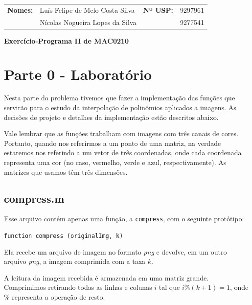 \documentclass[12pt,letterpaper]{article}
\begin{document}
	
	\begin{table}[]
		\centering
		\label{my-label}
		\begin{tabular}{llll}
			\textbf{Nomes:}&Luís Felipe de Melo Costa Silva &   \textbf{Nº USP:} & 9297961 \\
			& Nícolas Nogueira Lopes da Silva &         & 9277541 \\
		\end{tabular}
	\end{table}
	
	\begin{center}
		\huge \bf
		Exercício-Programa II de MAC0210 \\
	\end{center}
	
	\section{Parte 0 - Laboratório}
	
	Nesta parte do problema tivemos que fazer a implementação das funções que servirão para o estudo da interpolação de polinômios aplicados a imagens. As decisões de projeto e detalhes da implementação estão descritos abaixo. 
	
	Vale lembrar que as funções trabalham com imagens com três canais de cores. Portanto, quando nos referirmos a um ponto de uma matriz, na verdade estaremos nos referindo a um vetor de três coordenadas, onde cada coordenada representa uma cor (no caso, vermelho, verde e azul, respectivamente). As matrizes que usamos têm três dimensões.
	
	\subsection{compress.m}
	
	Esse arquivo contém apenas uma função, a \texttt{compress}, com o seguinte protótipo:
	
	\begin{center}
		\texttt{function compress (originalImg, k)}
	\end{center}
	
	Ela recebe um arquivo de imagem no formato \textit{png} e devolve, em um outro arquivo \textit{png}, a imagem comprimida com a taxa $k$.
	
	A leitura da imagem recebida é armazenada em uma matriz grande. Comprimimos retirando todas as linhas e colunas $i$ tal que $i\%(k+1)=1$, onde $\%$ representa a operação de resto.
	
\end{document}
